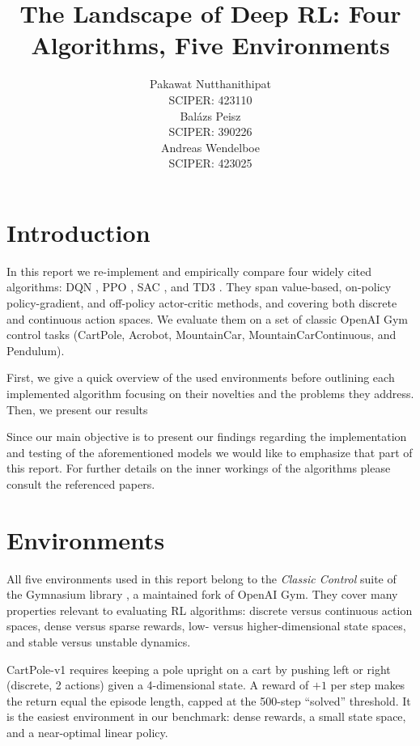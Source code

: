 \documentclass{article}
\title{The Landscape of Deep RL: Four Algorithms, Five Environments}
\author{%
  Pakawat Nutthanithipat \\
  SCIPER: 423110 \\
  \And
  Balázs Peisz \\
  SCIPER: 390226 \\
  \And
  Andreas Wendelboe \\
  SCIPER: 423025 \\
}
\begin{document}
\maketitle


\section{Introduction}

In this report we re-implement and empirically compare four widely cited algorithms: DQN \citep{mnih2013playing}, PPO \citep{schulman2017proximal}, SAC \citep{haarnoja2018soft}, and TD3 \citep{fujimoto2018addressing}. They span value-based, on-policy policy-gradient, and off-policy actor-critic methods, and covering both discrete and continuous action spaces. We evaluate them on a set of classic OpenAI Gym control tasks (CartPole, Acrobot, MountainCar, MountainCarContinuous, and Pendulum).

First, we give a quick overview of the used environments before outlining each implemented algorithm focusing on their novelties and the problems they address. Then, we present our results

Since our main objective is to present our findings regarding the implementation and testing of the aforementioned models we would like to emphasize that part of this report. For further details on the inner workings of the algorithms please consult the referenced papers.

\section{Environments}

All five environments used in this report belong to the \emph{Classic Control} suite of the Gymnasium library \citep{towers2024gymnasium}, a maintained fork of OpenAI Gym. They cover many properties relevant to evaluating RL algorithms: discrete versus continuous action spaces, dense versus sparse rewards, low- versus higher-dimensional state spaces, and stable versus unstable dynamics.

CartPole-v1 \citep{barto1983neuronlike} requires keeping a pole upright on a cart by pushing left or right (discrete, 2 actions) given a 4-dimensional state. A reward of $+1$ per step makes the return equal the episode length, capped at the 500-step ``solved'' threshold. It is the easiest environment in our benchmark: dense rewards, a small state space, and a near-optimal linear policy.
\end{document}
